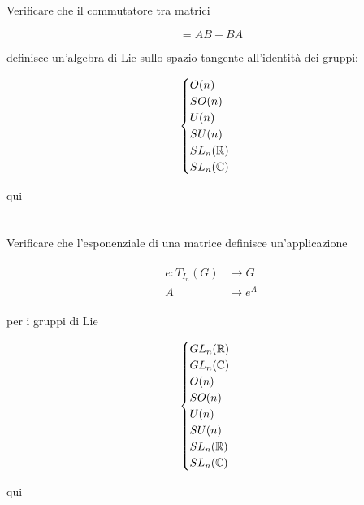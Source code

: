 \begin{tcolorbox}
	Verificare che il commutatore tra matrici
	
	\begin{equation}
		[A,B] = AB - BA
	\end{equation}

	definisce un'algebra di Lie sullo spazio tangente all'identità dei gruppi:
	
	\begin{equation}
		\begin{cases}
			O(n)\\
			SO(n)\\
			U(n)\\
			SU(n)\\
			SL_{n}(\mathbb{R})\\
			SL_{n}(\mathbb{C})
		\end{cases}
	\end{equation}
\end{tcolorbox}

qui

\tocless\section{}\label{es3-10}

\begin{tcolorbox}
	Verificare che l'esponenziale di una matrice definisce un'applicazione
	
	\begin{align}
		\begin{split}
			e : T_{I_{n}}(G) &\to G\\
			A &\mapsto e^{A}
		\end{split}
	\end{align}

	per i gruppi di Lie
	
	\begin{equation}
		\begin{cases}
			GL_{n}(\mathbb{R})\\
			GL_{n}(\mathbb{C})\\
			O(n)\\
			SO(n)\\
			U(n)\\
			SU(n)\\
			SL_{n}(\mathbb{R})\\
			SL_{n}(\mathbb{C})
		\end{cases}
	\end{equation}
\end{tcolorbox}

qui

